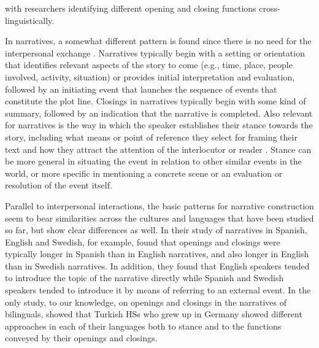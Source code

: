 \documentclass[output=paper,colorlinks,citecolor=brown]{langscibook}
\begin{document}
with researchers identifying different opening and closing functions cross-linguistically.
 
 In narratives, a somewhat different pattern is found since there is no need for the interpersonal exchange \parencite{berman_narrative_1997,labov_transformation_1972}. Narratives typically begin with a setting or orientation that identifies relevant aspects of the story to come (e.g., time, place, people involved, activity, situation) or provides initial interpretation and evaluation, followed by an initiating event that launches the sequence of events that constitute the plot line. Closings in narratives typically begin with some kind of summary, followed by an indication that the narrative is completed. Also relevant for narratives is the way in which the speaker establishes their stance towards the story, including what means or point of reference they select for framing their text and how they attract the attention of the interlocutor or reader \parencite{berman_narrative_1997,tolchinsky_text_2002}. Stance can be more general in situating the event in relation to other similar events in the world, or more specific in mentioning a concrete scene or an evaluation or resolution of the event itself. 
 
 Parallel to interpersonal interactions, the basic patterns for narrative construction seem to bear similarities across the cultures and languages that have been studied so far, but show clear differences as well. In their study of narratives in Spanish, English and Swedish, for example, \textcite{tolchinsky_text_2002} found that openings and closings were typically longer in Spanish than in English narratives, and also longer in English than in Swedish narratives. In addition, they found that English speakers tended to introduce the topic of the narrative directly while Spanish and Swedish speakers tended to introduce it by means of referring to an external event. In the only study, to our knowledge, on openings and closings in the narratives of bilinguals, \textcite{dollnick_entwicklung_2013} showed that Turkish HSs who grew up in Germany showed different approaches in each of their languages both to stance and to the functions conveyed by their openings and closings.\largerpage
 
\end{document}
